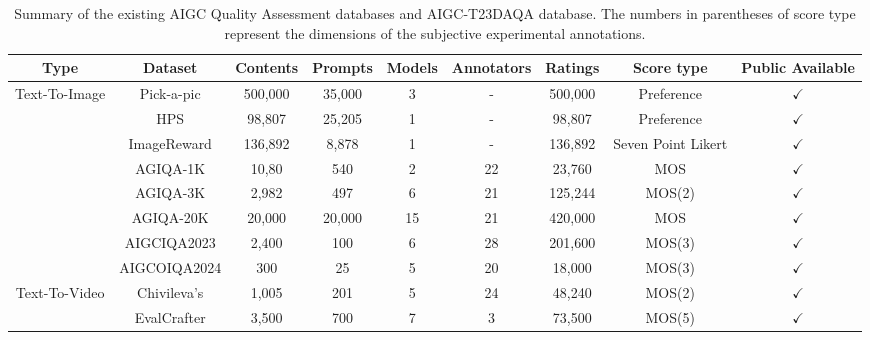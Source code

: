 \begin{table*}[t]
\caption{Summary of the existing AIGC Quality Assessment databases and AIGC-T23DAQA database. The numbers in parentheses of score type represent the dimensions of the subjective experimental annotations.\label{tab:summary}}
\centering
\begin{tabular}{c|c|c|c|c|c|c|c|c}
\toprule
Type                           & \multicolumn{1}{c|}{Dataset} & \multicolumn{1}{c|}{Contents}         & \multicolumn{1}{c|}{Prompts} & \multicolumn{1}{c|}{Models} & \multicolumn{1}{c|}{Annotators} & \multicolumn{1}{c|}{Ratings} & \multicolumn{1}{c|}{Score type}   & \multicolumn{1}{c}{Public Available} \\ \hline
\multirow{8}{*}{Text-To-Image} & Pick-a-pic\cite{kirstain2024pick}        & 500,000         & 35,000  & 3  & -  & 500,000   & Preference         & $\checkmark$ \\
                               & HPS\cite{wu2023human}                    & 98,807         & 25,205  & 1  & -  & 98,807    & Preference         & $\checkmark$    \\
                               & ImageReward\cite{xu2024imagereward}      & 136,892 & 8,878   & 1  & -  & 136,892   & Seven Point Likert & $\checkmark$ \\
                               & AGIQA-1K\cite{zhang2023perceptual}       & 10,80                & 540     & 2  & 22 & 23,760    & MOS                & $\checkmark$   \\
                               & AGIQA-3K\cite{10262331}                  & 2,982             & 497     & 6  & 21 & 125,244   & MOS(2)             & $\checkmark$   \\
                               & AGIQA-20K\cite{li2024aigiqa}             & 20,000                & 20,000  & 15 & 21 & 420,000   & MOS                & $\checkmark$  \\
                               & AIGCIQA2023\cite{wang2023aigciqa2023}    & 2,400            & 100     & 6  & 28 & 201,600   & MOS(3)             & $\checkmark$  \\ 
                               & AIGCOIQA2024\cite{yang2024aigcoiqa2024}  & 300            & 25     & 5  & 20 & 18,000   & MOS(3)             & $\checkmark$  \\ \hline
\multirow{5}{*}{Text-To-Video} & Chivileva's\cite{chivileva2023measuring} & 1,005             & 201     & 5  & 24 & 48,240    & MOS(2)             & $\checkmark$     \\
                               & EvalCrafter\cite{liu2023evalcrafter}     & 3,500             & 700     & 7  & 3  & 73,500    & MOS(5)             & $\checkmark$  \\

\end{tabular}
\end{table*}

